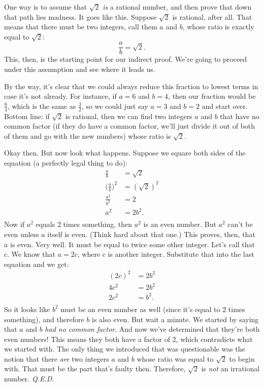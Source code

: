 One way is to assume that $\sqrt{2}$ \textit{is} a rational number, and
then prove that down that path lies madness. It goes like this. Suppose
$\sqrt{2}$ is rational, after all. That means that there must be two
integers, call them $a$ and $b$, whose ratio is exactly equal to
$\sqrt{2}$:
\[
\frac{a}{b} = \sqrt{2}.
\]
This, then, is the starting point for our indirect proof. We're going to
proceed under this assumption and see where it leads us.

By the way, it's clear that we could always reduce this fraction to lowest
terms in case it's not already. For instance, if $a=6$ and $b=4$, then our
fraction would be $\frac{6}{4}$, which is the same as $\frac{3}{2}$, so we
could just say $a=3$ and $b=2$ and start over. Bottom line: if $\sqrt{2}$
is rational, then we can find two integers $a$ and $b$ that have no common
factor (if they do have a common factor, we'll just divide it out of both
of them and go with the new numbers) whose ratio is $\sqrt{2}$.

Okay then. But now look what happens. Suppose we square both sides of the
equation (a perfectly legal thing to do):
\begin{align*}
\frac{a}{b} &= \sqrt{2} \\
\Bigg(\frac{a}{b}\Bigg)^2 &= (\sqrt{2})^2 \\
\frac{a^2}{b^2} &= 2 \\
a^2 &= 2{b^2}. \\
\end{align*}
Now if $a^2$ equals 2 times something, then $a^2$ is an even number. But
$a^2$ can't be even unless $a$ itself is even. (Think hard about that one.)
This proves, then, that $a$ is even. Very well. It must be equal to twice
some other integer. Let's call that $c$. We know that $a=2c$, where $c$ is
another integer. Substitute that into the last equation and we get:
\begin{align*}
(2c)^2 &= 2{b^2} \\
4c^2 &= 2{b^2} \\
2c^2 &= b^2. \\
\end{align*}
So it looks like $b^2$ must be an even number as well (since it's equal to
2 times something), and therefore $b$ is also even. But wait a minute. We
started by saying that $a$ and $b$ \textit{had no common factor}. And now
we've determined that they're both even numbers! This means they both have
a factor of 2, which contradicts what we started with. The only thing we
introduced that was questionable was the notion that there \textit{are} two
integers $a$ and $b$ whose ratio was equal to $\sqrt{2}$ to begin with.
That must be the part that's faulty then. Therefore, $\sqrt{2}$ is
\textit{not} an irrational number. \textit{Q.E.D.}

